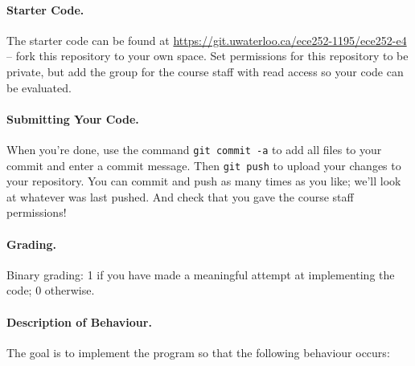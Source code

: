 \documentclass[a4paper]{report}
\newcommand{\termnumeric}{1195}
\begin{document}
\paragraph{Starter Code.} The starter code can be found at \url{https://git.uwaterloo.ca/ece252-\termnumeric/ece252-e4} -- fork this repository to your own space. Set permissions for this repository to be private, but add the group for the course staff with read access so your code can be evaluated.

\paragraph{Submitting Your Code.} When you're done, use the command \texttt{git commit -a} to add all files to your commit and enter a commit message. Then \texttt{git push} to upload your changes to your repository. You can commit and push as many times as you like; we'll look at whatever was last pushed. And check that you gave the course staff permissions!

\paragraph{Grading.} Binary grading: 1 if you have made a meaningful attempt at implementing the code; 0 otherwise.

\paragraph{Description of Behaviour.} The goal is to implement the program so that the following behaviour occurs:
\end{document}
